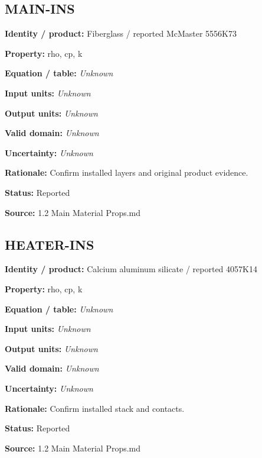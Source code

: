 \documentclass[11pt]{article}
\begin{document}
\begin{minipage}{\textwidth}\small\setlength{\parskip}{2pt}
\subsection*{MAIN-INS}
\textbf{Identity / product:} Fiberglass / reported McMaster 5556K73\par
\textbf{Property:} rho, cp, k\par
\textbf{Equation / table:} \textit{Unknown}\par
\textbf{Input units:} \textit{Unknown}\par
\textbf{Output units:} \textit{Unknown}\par
\textbf{Valid domain:} \textit{Unknown}\par
\textbf{Uncertainty:} \textit{Unknown}\par
\textbf{Rationale:} Confirm installed layers and original product evidence.\par
\textbf{Status:} Reported\par
\textbf{Source:} 1.2 Main Material Props.md\par
\end{minipage}\par\vspace{5pt}
\begin{minipage}{\textwidth}\small\setlength{\parskip}{2pt}
\subsection*{HEATER-INS}
\textbf{Identity / product:} Calcium aluminum silicate / reported 4057K14\par
\textbf{Property:} rho, cp, k\par
\textbf{Equation / table:} \textit{Unknown}\par
\textbf{Input units:} \textit{Unknown}\par
\textbf{Output units:} \textit{Unknown}\par
\textbf{Valid domain:} \textit{Unknown}\par
\textbf{Uncertainty:} \textit{Unknown}\par
\textbf{Rationale:} Confirm installed stack and contacts.\par
\textbf{Status:} Reported\par
\textbf{Source:} 1.2 Main Material Props.md\par
\end{minipage}\par\vspace{5pt}
\end{document}
